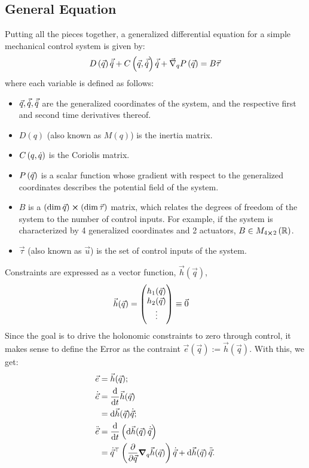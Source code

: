 \documentclass[main.tex]{subfiles}
\begin{document}
\subsection{General Equation}
Putting all the pieces together, a generalized differential equation for a simple mechanical control system is given by:
\begin{align}
    D\del{\vec q}\vec\qdd+C\del{\vec q,\vec\qd}\vec\qd+\vec\nabla_qP\del{\vec q}=B\vec\tau\label{control-equation}
\end{align}
where each variable is defined as follows:
\begin{itemize}
    \item $\vec q, \vec {\dot q}, \vec {\ddot q}$ are the generalized coordinates of the system, and the respective first and second time derivatives thereof.
    \item $D(q)$ (also known as $M(q)$) is the inertia matrix.
    \item $C\del{q,\qd}$ is the Coriolis matrix.
    \item $P\del{\vec q}$ is a scalar function whose gradient with respect to the generalized coordinates describes the potential field of the system.
    \item $B$ is a $\del{\dim \vec q }\cross\del{ \dim \vec\tau}$ matrix, which relates the degrees of freedom of the system to the number of control inputs. For example, if the system is characterized by 4 generalized coordinates and 2 actuators, $B\in M_{4\cross 2}\del{\ree}$.
    \item $\vec \tau$ (also known as $\vec u$) is the set of control inputs of the system.
\end{itemize}
Constraints are expressed as a vector function, $\vec{h}(\vec q)$,
    \begin{align}
        \vec{h}(\vec q)&=\pmqty{h_1(\vec q)\\h_2(\vec q)\\\vdots}\equiv \vec 0
    \end{align}
    Since the goal is to drive the holonomic constraints to zero through control, it makes sense to define the Error as the contraint $\vec e(\vec q):=\vec h(\vec q)$. With this, we get:
    \begin{align}
        \vec{e}&=\vec h(\vec q);\\
    \dot{\vec{e}}&=\dv{}{t}\vec h(\vec q)\\&=\dd \vec{h}(\vec{q})\dot{\vec{q}};\\
    \ddot{\vec{e}}&=\dv{}{t}\del{\dd {\vec{h}(\vec{q})}\dot{\vec{q}}}\\
    &=\dot{\vec{q}}^\top\del{\pdv{}{\vec q}\grad_q{\vec{h}(\vec{q})}}\dot{\vec{q}}+\dd {\vec{h}(\vec{q})}\ddot{\vec{q}}.\label{eq:edd}
    \end{align}
\end{document}
